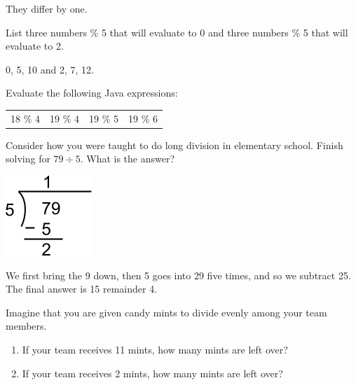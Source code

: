 \begin{answer}
They differ by one.
\end{answer}


\Q List three numbers \% 5 that will evaluate to 0 and three numbers \% 5 that will evaluate to 2.

\begin{answer}
0, 5, 10 and 2, 7, 12.
\end{answer}


\Q Evaluate the following Java expressions:

\begin{center}
\begin{tabular}{C{1in}C{1in}C{1in}C{1in}}
18 \% 4  &
19 \% 4  &
19 \% 5  &
19 \% 6  \\
\end{tabular}
\end{center}


\Q Consider how you were taught to do long division in elementary school.
Finish solving for $79 \div 5$.
What is the answer?

\begin{center}
\includegraphics[scale=0.65]{div79by5.png}
\end{center}

\begin{answer}[3em]
We first bring the 9 down, then 5 goes into 29 five times, and so we subtract 25. The final answer is 15 remainder 4.
\end{answer}


\Q Imagine that you are given candy mints to divide evenly among your team members.

\begin{enumerate}
\item If your team receives 11 mints, how many mints are left over?


\item If your team receives 2 mints, how many mints are left over?

\end{enumerate}


